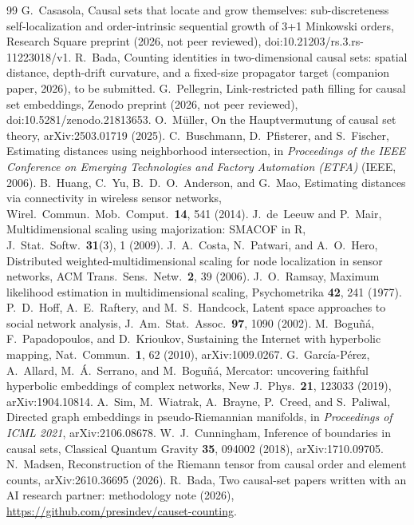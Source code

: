 \documentclass[prd,twocolumn,superscriptaddress,nofootinbib,amsmath,amssymb,floatfix]{revtex4-2}
\begin{document}
\begin{thebibliography}{99}
 G.~Casasola, Causal sets that locate and grow themselves: sub-discreteness self-localization and order-intrinsic sequential growth of 3+1 Minkowski orders, Research Square preprint (2026, not peer reviewed), doi:10.21203/rs.3.rs-11223018/v1.
 R.~Bada, Counting identities in two-dimensional causal sets: spatial distance, depth-drift curvature, and a fixed-size propagator target (companion paper, 2026), to be submitted.
 G.~Pellegrin, Link-restricted path filling for causal set embeddings, Zenodo preprint (2026, not peer reviewed), doi:10.5281/zenodo.21813653.
 O.~M\"uller, On the Hauptvermutung of causal set theory, arXiv:2503.01719 (2025).
 C.~Buschmann, D.~Pfisterer, and S.~Fischer, Estimating distances using neighborhood intersection, in \emph{Proceedings of the IEEE Conference on Emerging Technologies and Factory Automation (ETFA)} (IEEE, 2006).
 B.~Huang, C.~Yu, B.~D.~O.~Anderson, and G.~Mao, Estimating distances via connectivity in wireless sensor networks, Wirel.\ Commun.\ Mob.\ Comput.\ \textbf{14}, 541 (2014).
 J.~de~Leeuw and P.~Mair, Multidimensional scaling using majorization: SMACOF in R, J.\ Stat.\ Softw.\ \textbf{31}(3), 1 (2009).
 J.~A.~Costa, N.~Patwari, and A.~O.~Hero, Distributed weighted-multidimensional scaling for node localization in sensor networks, ACM Trans.\ Sens.\ Netw.\ \textbf{2}, 39 (2006).
 J.~O.~Ramsay, Maximum likelihood estimation in multidimensional scaling, Psychometrika \textbf{42}, 241 (1977).
 P.~D.~Hoff, A.~E.~Raftery, and M.~S.~Handcock, Latent space approaches to social network analysis, J.\ Am.\ Stat.\ Assoc.\ \textbf{97}, 1090 (2002).
 M.~Bogu\~n\'a, F.~Papadopoulos, and D.~Krioukov, Sustaining the Internet with hyperbolic mapping, Nat.\ Commun.\ \textbf{1}, 62 (2010), arXiv:1009.0267.
 G.~Garc\'ia-P\'erez, A.~Allard, M.~\'A.~Serrano, and M.~Bogu\~n\'a, Mercator: uncovering faithful hyperbolic embeddings of complex networks, New J.\ Phys.\ \textbf{21}, 123033 (2019), arXiv:1904.10814.
 A.~Sim, M.~Wiatrak, A.~Brayne, P.~Creed, and S.~Paliwal, Directed graph embeddings in pseudo-Riemannian manifolds, in \emph{Proceedings of ICML 2021}, arXiv:2106.08678.
 W.~J.~Cunningham, Inference of boundaries in causal sets, Classical Quantum Gravity \textbf{35}, 094002 (2018), arXiv:1710.09705.
 N.~Madsen, Reconstruction of the Riemann tensor from causal order and element counts, arXiv:2610.36695 (2026).
 R.~Bada, Two causal-set papers written with an AI research partner: methodology note (2026), \url{https://github.com/presindev/causet-counting}.
\end{thebibliography}
\end{document}
